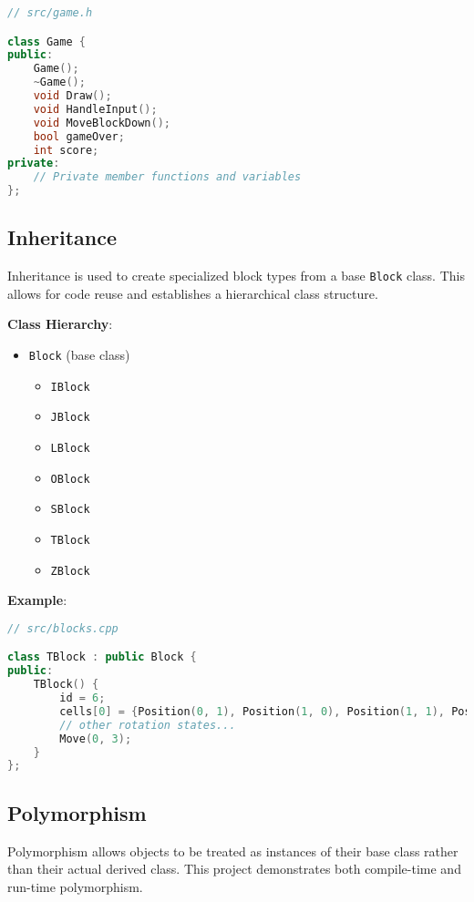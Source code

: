 \documentclass{article}
\begin{document}
\begin{lstlisting}[language=C++]
// src/game.h

class Game {
public:
    Game();
    ~Game();
    void Draw();
    void HandleInput();
    void MoveBlockDown();
    bool gameOver;
    int score;
private:
    // Private member functions and variables
};
\end{lstlisting}

\subsection{Inheritance}

Inheritance is used to create specialized block types from a base \texttt{Block} class. This allows for code reuse and establishes a hierarchical class structure.

\textbf{Class Hierarchy}:

\begin{itemize}
    \item \texttt{Block} (base class)
    \begin{itemize}
        \item \texttt{IBlock}
        \item \texttt{JBlock}
        \item \texttt{LBlock}
        \item \texttt{OBlock}
        \item \texttt{SBlock}
        \item \texttt{TBlock}
        \item \texttt{ZBlock}
    \end{itemize}
\end{itemize}

\textbf{Example}:

\begin{lstlisting}[language=C++]
// src/blocks.cpp

class TBlock : public Block {
public:
    TBlock() {
        id = 6;
        cells[0] = {Position(0, 1), Position(1, 0), Position(1, 1), Position(1, 2)};
        // other rotation states...
        Move(0, 3);
    }
};
\end{lstlisting}

\subsection{Polymorphism}

Polymorphism allows objects to be treated as instances of their base class rather than their actual derived class. This project demonstrates both compile-time and run-time polymorphism.
\end{document}
